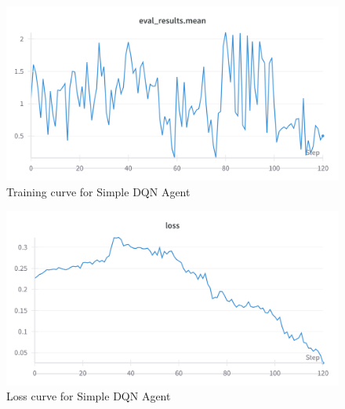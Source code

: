 \begin{figure}[h]
    \centering
    \includegraphics[width=\linewidth]{results/IQL.png}
    \caption{
      Training curve for Simple DQN Agent
    }
    \label{fig:dqnmean}
  \end{figure}
  
  \begin{figure}[h]
    \centering
    \includegraphics[width=\linewidth]{results/IQL-loss.png}
    \caption{
        Loss curve for Simple DQN Agent
    }
    \label{fig:dqnloss}
  \end{figure}



